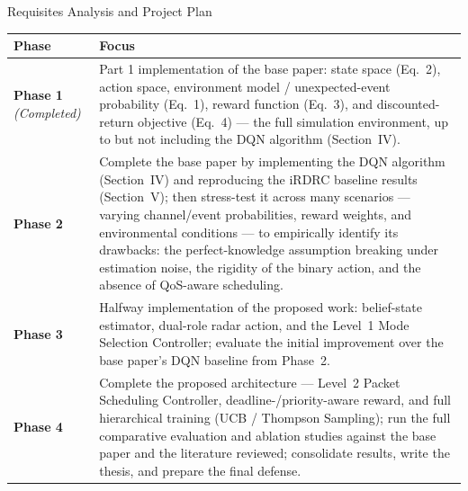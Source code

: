 \documentclass[aspectratio=169]{beamer}
\begin{document}
\begin{frame}{Requisites Analysis and Project Plan}
  \scriptsize
  \renewcommand{\arraystretch}{1.15}
  \begin{tabular}{@{}p{3.1cm}p{9.6cm}@{}}
    \toprule
    \textbf{Phase} & \textbf{Focus} \\
    \midrule
    \textbf{Phase 1} \textit{(Completed)} & Part 1 implementation of the base paper: state space (Eq.~2), action space, environment model / unexpected-event probability (Eq.~1), reward function (Eq.~3), and discounted-return objective (Eq.~4) --- the full simulation environment, up to but not including the DQN algorithm (Section~IV). \\
    \textbf{Phase 2} & Complete the base paper by implementing the DQN algorithm (Section~IV) and reproducing the iRDRC baseline results (Section~V); then stress-test it across many scenarios --- varying channel/event probabilities, reward weights, and environmental conditions --- to empirically identify its drawbacks: the perfect-knowledge assumption breaking under estimation noise, the rigidity of the binary action, and the absence of QoS-aware scheduling. \\
    \textbf{Phase 3} & Halfway implementation of the proposed work: belief-state estimator, dual-role radar action, and the Level~1 Mode Selection Controller; evaluate the initial improvement over the base paper's DQN baseline from Phase~2. \\
    \textbf{Phase 4} & Complete the proposed architecture --- Level~2 Packet Scheduling Controller, deadline-/priority-aware reward, and full hierarchical training (UCB / Thompson Sampling); run the full comparative evaluation and ablation studies against the base paper and the literature reviewed; consolidate results, write the thesis, and prepare the final defense. \\
    \bottomrule
  \end{tabular}
\end{frame}
\end{document}
